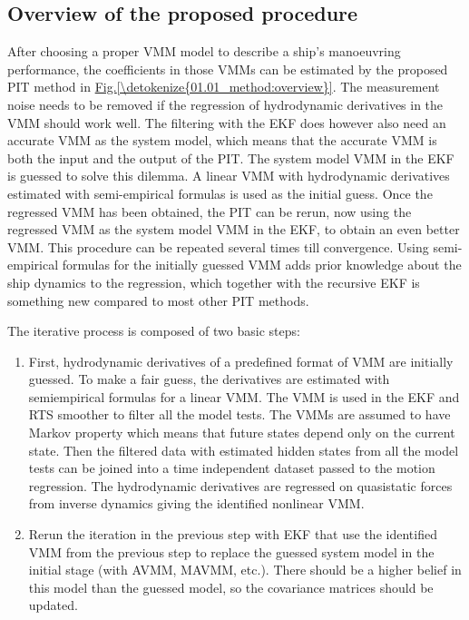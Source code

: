 \documentclass[review]{elsarticle}
\begin{document}
\subsection{Overview of the proposed procedure}
\label{\detokenize{01.01_method:overview-of-the-proposed-procedure}}
\sphinxAtStartPar
After choosing a proper VMM model to describe a ship’s manoeuvring performance, the coefficients in those VMMs can be estimated by the proposed PIT method in \hyperref[\detokenize{01.01_method:overview}]{Fig.\@ \ref{\detokenize{01.01_method:overview}}}. 
The measurement noise needs to be removed if the regression of hydrodynamic derivatives in the VMM should work well. The filtering with the EKF does however also need an accurate VMM as the system model, which means that the accurate VMM is both the input and the output of the PIT. The system model VMM in the EKF is guessed to solve this dilemma. A linear VMM with hydrodynamic derivatives estimated with semi-empirical formulas is used as the initial guess. Once the regressed VMM has been obtained, the PIT can be rerun, now using the regressed VMM as the system model VMM in the EKF, to obtain an even better VMM. This procedure can be repeated several times till convergence. Using semi-empirical formulas for the initially guessed VMM adds prior knowledge about the ship dynamics to the regression, which together with the recursive EKF is something new compared to most other PIT methods.  

The iterative process is composed of two basic steps:
\begin{enumerate}
%
\item {} 
\sphinxAtStartPar
First, hydrodynamic derivatives of a pre\sphinxhyphen{}defined format of VMM are initially guessed. To make a fair guess, the derivatives are estimated with semi\sphinxhyphen{}empirical formulas for a linear VMM. The VMM is used in the EKF and RTS smoother to filter all the model tests. The VMMs are assumed to have Markov property which means that future states depend only on the current state. Then the filtered data with estimated hidden states from all the model tests can be joined into a time independent dataset passed to the motion regression. The hydrodynamic derivatives are regressed on quasi\sphinxhyphen{}static forces from inverse dynamics giving the identified nonlinear VMM.

\item {} 
\sphinxAtStartPar
Re\sphinxhyphen{}run the iteration in the previous step with EKF that use the identified VMM from the previous step to replace the guessed system model in the initial stage (with AVMM, MAVMM, etc.). There should be a higher belief in this model than the guessed model, so the covariance matrices should be updated.

\end{enumerate}
\end{document}
